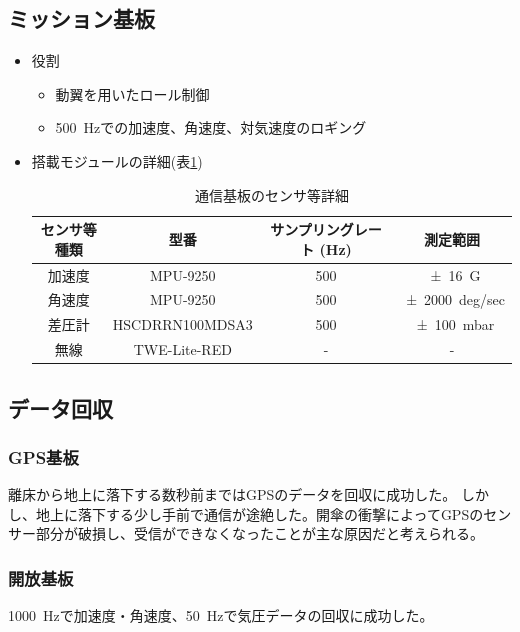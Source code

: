 \documentclass[a4paper,11pt,titlepage,uplatex]{jsarticle}
\begin{document}
\subsection{ミッション基板}
\begin{itemize}
	\item 役割
	      \begin{itemize}
		      \item 動翼を用いたロール制御
		      \item \SI{500}{Hz}での加速度、角速度、対気速度のロギング
	      \end{itemize}

	\item 搭載モジュールの詳細(表\ref{tab:mission_detail})
	      \begin{table}[H]
		      \centering
		      \caption{通信基板のセンサ等詳細}
		      \begin{tabular}{cccc} \toprule
			      センサ等種類 & 型番              & サンプリングレート (\si{Hz}) & 測定範囲                 \\ \midrule
			      加速度    & MPU-9250        & 500                 & \SI{+-16}{G}         \\
			      角速度    & MPU-9250        & 500                 & \SI{+-2000}{deg/sec} \\
			      差圧計    & HSCDRRN100MDSA3 & 500                 & \SI{+-100}{mbar}     \\
			      無線     & TWE-Lite-RED    & -                   & -                    \\
			      \bottomrule
		      \end{tabular}
		      \label{tab:mission_detail}
	      \end{table}
\end{itemize}

\subsection{データ回収}
\subsubsection{GPS基板}
離床から地上に落下する数秒前まではGPSのデータを回収に成功した。
しかし、地上に落下する少し手前で通信が途絶した。開傘の衝撃によってGPSのセンサー部分が破損し、受信ができなくなったことが主な原因だと考えられる。

\subsubsection{開放基板}
\SI{1000}{Hz}で加速度・角速度、\SI{50}{Hz}で気圧データの回収に成功した。
\end{document}
